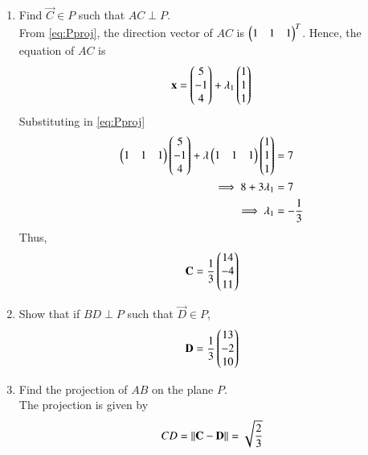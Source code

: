 \documentclass[journal,12pt,twocolumn]{IEEEtran}
\renewcommand\thesection{\arabic{section}}
\begin{document}
\begin{enumerate}[label=\thesection.\arabic*
,ref=\thesection.\theenumi]
\begin{figure}[!ht]
\caption{}
\label{fig:3.2}
\end{figure}
\item Find $\vec{C} \in P$  such that $AC \perp P$.  
\\
\solution From \eqref{eq:Pproj}, the direction vector of $AC$ is $\begin{pmatrix}1 & 1 & 1\end{pmatrix}^T$.  Hence, the equation of 
$AC$ is
\begin{equation}
\mathbf{x} = \begin{pmatrix}5 \\ -1 \\ 4\end{pmatrix} + \lambda_1  \begin{pmatrix}1 \\ 1 \\ 1\end{pmatrix}
\end{equation}
Substituting in \eqref{eq:Pproj}
\begin{align}
 \begin{pmatrix}1 & 1 & 1\end{pmatrix}\begin{pmatrix}5 \\ -1 \\ 4\end{pmatrix} + \lambda \begin{pmatrix}1 & 1 & 1\end{pmatrix}
\begin{pmatrix}1 \\ 1 \\ 1\end{pmatrix} &= 7
\\
\implies 8 + 3\lambda_1 &= 7
\\
\implies \lambda_1 &= -\frac{1}{3}
\end{align}
Thus,
\begin{align}
\mathbf{C} = \frac{1}{3}\begin{pmatrix}14 \\ -4 \\ 11\end{pmatrix}
\end{align}
\item Show that if $BD \perp P$  such that $\vec{D} \in P$,
\begin{equation}
\mathbf{D} = \frac{1}{3}\begin{pmatrix}13 \\ -2 \\ 10\end{pmatrix}
\end{equation}
%
\item Find the projection of $AB$ on the plane $P$.
\\
\solution The projection is given by
\begin{align}
CD = \lVert\mathbf{C}-\mathbf{D}\rVert = \sqrt{\frac{2}{3}}
\end{align}
\end{enumerate}
\end{document}
